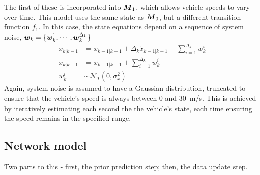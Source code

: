 The first of these is incorporated into $\mbox{$\boldsymbol{M}$}_1$,
which allows vehicle speeds to vary over time.
This model uses the same state as $\mbox{$\boldsymbol{M}$}_0$,
but a different transition function $f_1$.
In this case, the state equations depend on a sequence of system noise,
$\boldsymbol{w}_k = \{\boldsymbol{w}_k^1, \cdots, \boldsymbol{w}_k^{\Delta_k}\}$
\begin{align*}
x_{k|k-1} &= x_{k-1|k-1} + \Delta_k \dot x_{k-1|k-1} + \sum_{i=1}^{\Delta_k} w_k^i \\
\dot x_{k|k-1} &= \dot x_{k-1|k-1} + \sum_{i=1}^{\Delta_k} w_k^i \\
w_k^i &\sim \mathcal{N}_T(0, \sigma_x^2)
\end{align*}
Again, system noise is assumed to have a Gaussian distribution, 
truncated to ensure that the vehicle's speed is always between 0 and 30~m/s.
This is achieved by iteratively estimating each second the the vehicle's state,
each time ensuring the speed remains in the specified range.



\subsection{Network model}
\label{sec:kf}

Two parts to this - first, the prior prediction step; then, the data update step.

